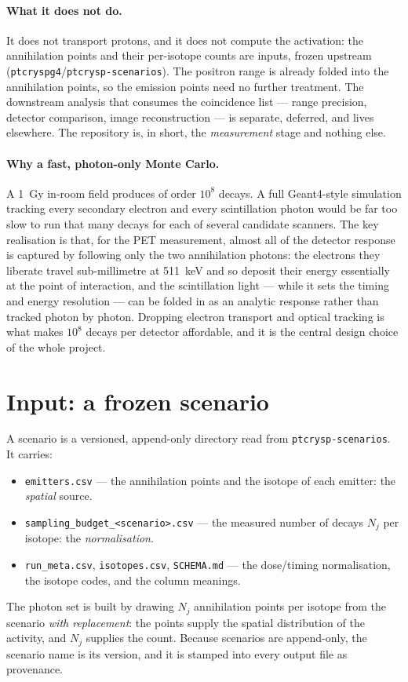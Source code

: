 \documentclass[11pt]{article}
\begin{document}
\paragraph{What it does not do.}
It does not transport protons, and it does not compute the activation: the annihilation
points and their per-isotope counts are inputs, frozen upstream
(\texttt{ptcryspg4}/\texttt{ptcrysp-scenarios}). The positron range is already folded into
the annihilation points, so the emission points need no further treatment. The downstream
analysis that consumes the coincidence list --- range precision, detector comparison, image
reconstruction --- is separate, deferred, and lives elsewhere. The repository is, in short,
the \emph{measurement} stage and nothing else.

\paragraph{Why a fast, photon-only Monte Carlo.}
A \SI{1}{Gy} in-room field produces of order $10^{8}$ decays. A full
Geant4-style simulation tracking every secondary electron and every scintillation photon
would be far too slow to run that many decays for each of several candidate scanners. The
key realisation is that, for the PET measurement, almost all of the detector response is
captured by following only the two annihilation photons: the electrons they liberate travel
sub-millimetre at \SI{511}{keV} and so deposit their energy essentially at the point of
interaction, and the scintillation light --- while it sets the timing and energy resolution
--- can be folded in as an analytic response rather than tracked photon by photon. Dropping
electron transport and optical tracking is what makes $10^{8}$ decays per detector
affordable, and it is the central design choice of the whole project.

\section{Input: a frozen scenario}
\label{sec:scenario}

A scenario is a versioned, append-only directory read from \texttt{ptcrysp-scenarios}. It
carries:
\begin{itemize}[nosep]
\item \texttt{emitters.csv} --- the annihilation points and the isotope of each emitter:
the \emph{spatial} source.
\item \texttt{sampling\_budget\_<scenario>.csv} --- the measured number of decays $N_j$ per
isotope: the \emph{normalisation}.
\item \texttt{run\_meta.csv}, \texttt{isotopes.csv}, \texttt{SCHEMA.md} --- the dose/timing
normalisation, the isotope codes, and the column meanings.
\end{itemize}
The photon set is built by drawing $N_j$ annihilation points per isotope from the scenario
\emph{with replacement}: the points supply the spatial distribution of the activity, and
$N_j$ supplies the count. Because scenarios are append-only, the scenario name is its
version, and it is stamped into every output file as provenance.
\end{document}

